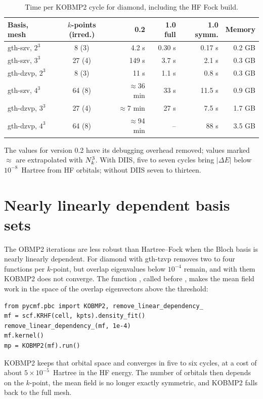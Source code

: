\begin{table}[!htb]
\centering
\small
\caption{Time per KOBMP2 cycle for diamond, including the HF Fock build.}
\label{tab:ktimings}
\begin{tabular}{@{}l c r r r r@{}}
\toprule
Basis, mesh & $k$-points (irred.) & 0.2 & 1.0 full & 1.0 symm. & Memory \\
\midrule
gth-szv, $2^3$  & 8 (3)  & 4.2 s & 0.30 s & 0.17 s & 0.2 GB \\
gth-szv, $3^3$  & 27 (4) & 149 s & 3.7 s  & 2.1 s  & 0.3 GB \\
gth-dzvp, $2^3$ & 8 (3)  & 11 s  & 1.1 s  & 0.8 s  & 0.3 GB \\
gth-szv, $4^3$  & 64 (8) & $\approx$36 min & 33 s & 11.5 s & 0.9 GB \\
gth-dzvp, $3^3$ & 27 (4) & $\approx$7 min  & 27 s & 7.5 s  & 1.7 GB \\
gth-dzvp, $4^3$ & 64 (8) & $\approx$94 min & --   & 88 s   & 3.5 GB \\
\bottomrule
\end{tabular}
\end{table}

The values for version 0.2 have its debugging overhead removed; values marked
$\approx$ are extrapolated with $N_k^3$. With DIIS, five to seven cycles bring
$|\Delta E|$ below $10^{-8}$~Hartree from HF orbitals; without DIIS seven to
thirteen.

\section{Nearly linearly dependent basis sets}
\label{sec:lindep}

The OBMP2 iterations are less robust than Hartree--Fock when the Bloch basis
is nearly linearly dependent. For diamond with gth-tzvp \pyscf{} removes two
to four functions per $k$-point, but overlap eigenvalues below $10^{-4}$
remain, and with them KOBMP2 does not converge. The function
, called before
, makes the mean field work in the space of the overlap
eigenvectors above the threshold:

\begin{lstlisting}[style=python]
from pycmf.pbc import KOBMP2, remove_linear_dependency_
mf = scf.KRHF(cell, kpts).density_fit()
remove_linear_dependency_(mf, 1e-4)
mf.kernel()
mp = KOBMP2(mf).run()
\end{lstlisting}

KOBMP2 keeps that orbital space and converges in five to six cycles, at a
cost of about $5\times10^{-5}$~Hartree in the HF energy. The number of
orbitals then depends on the $k$-point, the mean field is no longer exactly
symmetric, and KOBMP2 falls back to the full mesh.

